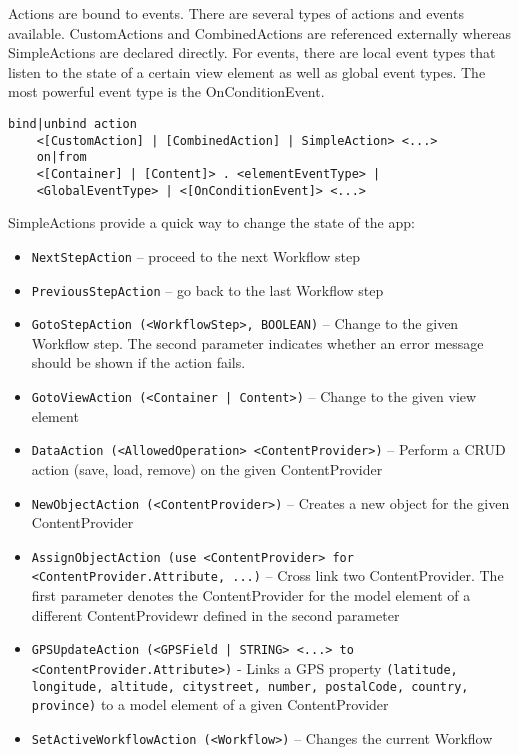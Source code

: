 Actions are bound to events. There are several types of actions and events available. CustomActions and CombinedActions are referenced externally whereas SimpleActions are declared directly. For events, there are local event types that listen to the state of a certain view element as well as global event types. The most powerful event type is the OnConditionEvent.

\begin{lstlisting}
bind|unbind action
	<[CustomAction] | [CombinedAction] | SimpleAction> <...>
	on|from
	<[Container] | [Content]> . <elementEventType> |
	<GlobalEventType> | <[OnConditionEvent]> <...>
\end{lstlisting}

SimpleActions provide a quick way to change the state of the app:
\begin{itemize}
\item \lstinline!NextStepAction! -- proceed to the next Workflow step
\item  \lstinline!PreviousStepAction! -- go back to the last Workflow step
\item  \lstinline!GotoStepAction (<WorkflowStep>, BOOLEAN)! -- Change to the given Workflow step. The second parameter indicates whether an error message should be shown if the action fails.
\item \lstinline!GotoViewAction (<Container | Content>)! -- Change to the given view element
\item \lstinline!DataAction (<AllowedOperation> <ContentProvider>)! -- Perform a CRUD action (save, load, remove) on the given ContentProvider
\item \lstinline!NewObjectAction (<ContentProvider>)! -- Creates a new object for the given ContentProvider
\item  \lstinline!AssignObjectAction (use <ContentProvider> for <ContentProvider.Attribute, ...)! -- Cross link two ContentProvider. The first parameter denotes the ContentProvider for the model element of a different ContentProvidewr defined in the second parameter
\item \lstinline!GPSUpdateAction (<GPSField | STRING> <...> to <ContentProvider.Attribute>)! - Links a GPS property \lstinline!(latitude, longitude, altitude, citystreet, number, postalCode, country, province)! to a model element of a given ContentProvider
\item  \lstinline!SetActiveWorkflowAction (<Workflow>)! -- Changes the current Workflow
\end{itemize}

